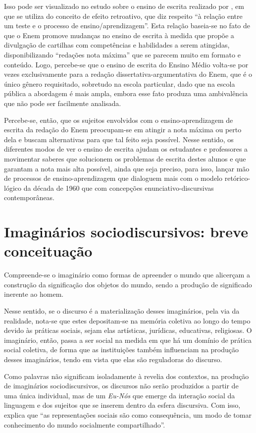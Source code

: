 \documentclass[portuguese]{textolivre}
\begin{document}
Isso pode ser visualizado no estudo sobre o ensino de escrita realizado por \textcite{vicentini_redaco_2015}, em que se utiliza do conceito de efeito retroativo, que diz respeito “à relação entre um teste e o processo de ensino/aprendizagem”. Esta relação baseia-se no fato de que o Enem promove mudanças no ensino de escrita à medida que propõe a divulgação de cartilhas com competências e habilidades a serem atingidas, disponibilizando “redações nota máxima” que se parecem muito em formato e conteúdo. Logo, percebe-se que o ensino de escrita do Ensino Médio volta-se por vezes exclusivamente para a redação dissertativa-argumentativa do Enem, que é o único gênero requisitado, sobretudo na escola particular, dado que na escola pública a abordagem é mais ampla, embora esse fato produza uma ambivalência que não pode ser facilmente analisada.

Percebe-se, então, que os sujeitos envolvidos com o ensino-aprendizagem de escrita da redação do Enem preocupam-se em atingir a nota máxima ou perto dela e buscam alternativas para que tal feito seja possível. Nesse sentido, os diferentes modos de ver o ensino de escrita ajudam os estudantes e professores a movimentar saberes que solucionem os problemas de escrita destes alunos e que garantam a nota mais alta possível, ainda que seja preciso, para isso, lançar mão de processos de ensino-aprendizagem que dialoguem mais com o modelo retórico-lógico da década de 1960 que com concepções enunciativo-discursivas contemporâneas.  

\section{Imaginários sociodiscursivos: breve conceituação }\label{sec-conduta}
Compreende-se o imaginário como formas de apreender o mundo que alicerçam a construção da significação dos objetos do mundo, sendo a produção de significado inerente ao homem. 

Nesse sentido, se o discurso é a materialização desses imaginários, pela via da realidade, nota-se que estes depositam-se na memória coletiva ao longo do tempo devido às práticas sociais, sejam elas artísticas, jurídicas, educativas, religiosas. O imaginário, então, passa a ser social na medida em que há um domínio de prática social coletiva, de forma que as instituições também influenciam na produção desses imaginários, tendo em vista que elas são reguladoras do discurso. 

Como palavras não significam isoladamente à revelia dos contextos, na produção de imaginários sociodiscursivos, os discursos não serão produzidos a partir de uma única individual, mas de um \textit{Eu-Nós} que emerge da interação social da linguagem e dos sujeitos que se inserem dentro da esfera discursiva. Com isso, \textcite[p. 575]{charaudeau_os_2017} explica que “as representações sociais são como consequência, um modo de tomar conhecimento do mundo socialmente compartilhado”. 
\end{document}
